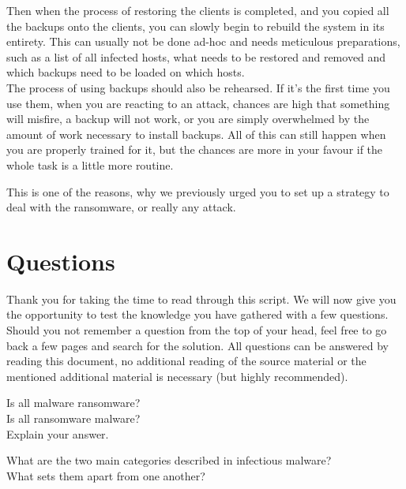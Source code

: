 Then when the process of restoring the clients is completed, and you copied all the backups onto the clients, you can slowly begin to rebuild the system in its entirety.
This can usually not be done ad-hoc and needs meticulous preparations, such as a list of all infected hosts, what needs to be restored and removed and which backups need to be loaded on which hosts.
\\

The process of using backups should also be rehearsed.
If it's the first time you use them, when you are reacting to an attack, chances are high that something will misfire, a backup will not work, or you are simply overwhelmed by the amount of work necessary to install backups.
All of this can still happen when you are properly trained for it, but the chances are more in your favour if the whole task is a little more routine.

This is one of the reasons, why we previously urged you to set up a strategy to deal with the ransomware, or really any attack.
\chapter{Questions}

Thank you for taking the time to read through this script.
We will now give you the opportunity to test the knowledge you have gathered with a few questions.
Should you not remember a question from the top of your head, feel free to go back a few pages and search for the solution.
All questions can be answered by reading this document, no additional reading of the source material or the mentioned additional material is necessary (but highly recommended).

\begin{question}[Question]
    Is all malware ransomware?\\
    Is all ransomware malware?\\
    Explain your answer.
\end{question}

\begin{question}[Answer]
    \vspace{3cm}
\end{question}


\begin{question}[Question]
    What are the two main categories described in infectious malware?\\
    What sets them apart from one another?
\end{question}


